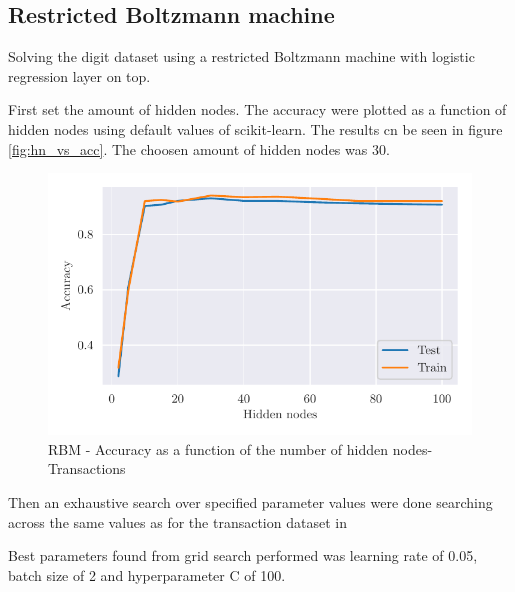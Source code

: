 \documentclass[../main.tex]{subfiles}
\begin{document}
\subsection{Restricted Boltzmann machine}
Solving the digit dataset using a restricted Boltzmann machine with logistic regression layer on top.

First set the amount of hidden nodes. The accuracy were plotted as a function of hidden nodes using default values of scikit-learn. The results cn be seen in figure \autoref{fig:hn_vs_acc}. The choosen amount of hidden nodes was 30.

\begin{figure}
    \begin{center}
        \includegraphics{figures/rbm_h_vs_acc_digit2.pdf}
        \caption{RBM - Accuracy as a function of the number of hidden nodes- Transactions}
        \label{fig:hn_vs_acc}
    \end{center}
\end{figure}

Then an exhaustive search over specified parameter values were done searching across the same values as for the transaction dataset in 

Best parameters found from grid search performed was learning rate of 0.05, batch size of 2 and hyperparameter C of 100.
\end{document}
